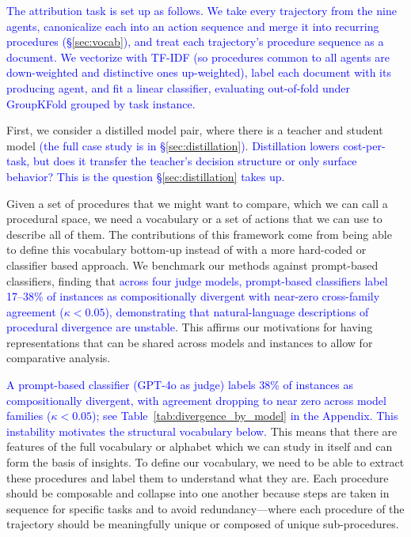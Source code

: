 \documentclass[12pt]{article}
\begin{document}
\textcolor{blue}{The attribution task is set up as follows. We take every trajectory from the nine agents, canonicalize each into an action sequence and merge it into recurring procedures (\S\ref{sec:vocab}), and treat each trajectory's procedure sequence as a document. We vectorize with TF-IDF (so procedures common to all agents are down-weighted and distinctive ones up-weighted), label each document with its producing agent, and fit a linear classifier, evaluating out-of-fold under GroupKFold grouped by task instance.}

First, we consider a distilled model pair, where there is a teacher and student model\textcolor{blue}{ (the full case study is in \S\ref{sec:distillation})}. \textcolor{blue}{Distillation lowers cost-per-task, but does it transfer the teacher's decision structure or only surface behavior? This is the question \S\ref{sec:distillation} takes up.}

Given a set of procedures that we might want to compare, which we can call a procedural space, we need a vocabulary or a set of actions that we can use to describe all of them. The contributions of this framework come from being able to define this vocabulary bottom-up instead of with a more hard-coded or classifier based approach. We benchmark our methods against prompt-based classifiers, finding that \textcolor{blue}{across four judge models, prompt-based classifiers label 17--38\% of instances as compositionally divergent with near-zero cross-family agreement ($\kappa < 0.05$), demonstrating that natural-language descriptions of procedural divergence are unstable}. This affirms our motivations for having representations that can be shared across models and instances to allow for comparative analysis.

\textcolor{blue}{A prompt-based classifier (GPT-4o as judge) labels 38\% of instances as compositionally divergent, with agreement dropping to near zero across model families ($\kappa < 0.05$); see Table~\ref{tab:divergence_by_model} in the Appendix. This instability motivates the structural vocabulary below.} This means that there are features of the full vocabulary or alphabet which we can study in itself and can form the basis of insights. To define our vocabulary, we need to be able to extract these procedures and label them to understand what they are. Each procedure should be composable and collapse into one another because steps are taken in sequence for specific tasks and to avoid redundancy---where each procedure of the trajectory should be meaningfully unique or composed of unique sub-procedures.
\end{document}
